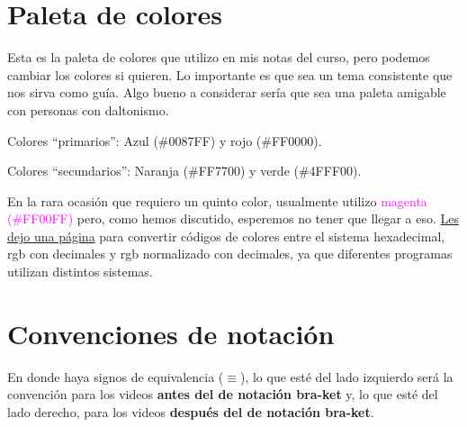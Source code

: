\documentclass[12pt,dvipsnames]{article}
\numberwithin{equation}{section}
\begin{document}
\section{Paleta de colores}

Esta es la paleta de colores que utilizo en mis notas del curso, pero podemos cambiar los colores si quieren. Lo importante es que sea un tema consistente que nos sirva como guía. Algo bueno a considerar sería que sea una paleta amigable con personas con daltonismo.

Colores ``primarios'': \textcolor{AZUL}{Azul (\#0087FF)} y \textcolor{ROJO}{rojo (\#FF0000)}.

Colores ``secundarios'': \textcolor{NARANJA}{Naranja (\#FF7700)} y \textcolor{VERDE}{verde (\#4FFF00)}.

En la rara ocasión que requiero un quinto color, usualmente utilizo \textcolor{magenta}{magenta (\#FF00FF)} pero, como hemos discutido, esperemos no tener que llegar a eso. \hyperlink{https://doc.instantreality.org/tools/color_calculator/}{Les dejo una página} para convertir códigos de colores entre el sistema hexadecimal, rgb con decimales y rgb normalizado con decimales, ya que diferentes programas utilizan distintos sistemas.

\section{Convenciones de notación}

En donde haya signos de equivalencia ($\equiv$), lo que esté del lado izquierdo será la convención para los videos \textbf{antes del de notación bra-ket} y, lo que esté del lado derecho, para los videos \textbf{después del de notación bra-ket}.
\end{document}
